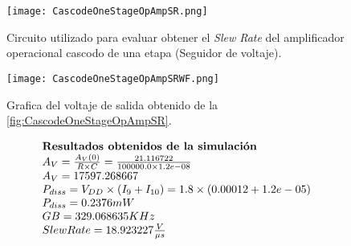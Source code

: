 \begin{figure}[ht]
	\centering
	\texttt{[image: CascodeOneStageOpAmpSR.png]}
	\caption{Circuito utilizado para evaluar obtener el \textit{Slew Rate} del amplificador operacional cascodo de una etapa (Seguidor de voltaje). \label{fig:CascodeOneStageOpAmpSR}}
\end{figure}

\begin{figure}[ht]
	\centering
	\texttt{[image: CascodeOneStageOpAmpSRWF.png]}
	\caption{Grafica del voltaje de salida obtenido de la \autoref{fig:CascodeOneStageOpAmpSR}. \label{fig:CascodeOneStageOpAmpSRWF}}
\end{figure}

\begin{equation*}
	\begin{array}{l l}
		\textbf{Resultados obtenidos de la simulación} \\
		A_{V} = \frac{A_{V}(0)}{R \times C} = \frac{ 21.116722 }{ 100000.0 \times 1.2e-08 } \\
		A_{V} =  17597.268667  \\
		P_{diss} = V_{DD} \times (I_{9}+I_{10}) =  1.8 \times ( 0.00012  +  1.2e-05 ) \\
		P_{diss} =  0.2376  mW \\
		GB =  329.068635  KHz \\
		Slew Rate =  18.923227 \frac{V}{\mu s} \\
	\end{array}
\end{equation*}